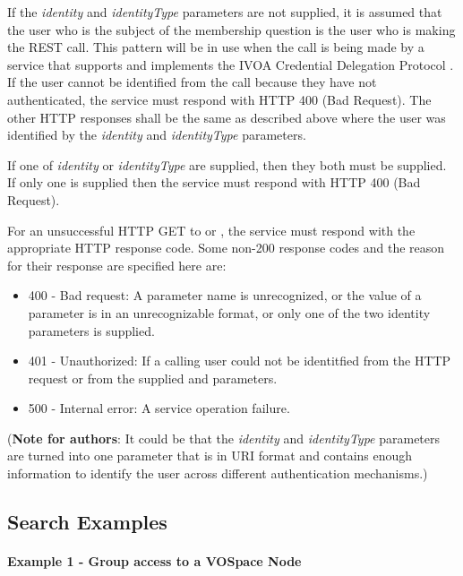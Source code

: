 \documentclass[11pt,a4paper]{ivoa}
\begin{document}
If the \emph{identity} and \emph{identityType} parameters are not supplied, it is assumed that the user who is the subject of the membership question is the user who is making the REST call.  This pattern will be in use when the call is being made by a service that supports and implements the IVOA Credential Delegation Protocol \citep{2010ivoa.spec.0218P}.  If the user cannot be identified from the call because they have not authenticated, the service must respond with HTTP 400 (Bad Request).  The other HTTP responses shall be the same as described above where the user was identified by the \emph{identity} and \emph{identityType} parameters.

If one of \emph{identity} or \emph{identityType} are supplied, then they both must be supplied.  If only one is supplied then the service must respond with HTTP 400 (Bad Request).

For an unsuccessful HTTP GET to  or , the service must respond with the appropriate HTTP response code.  Some non-200 response codes and the reason for their response are specified here are:

\begin{itemize}
\item{400} - Bad request:  A parameter name is unrecognized, or the value of a parameter is in an unrecognizable format, or only one of the two identity parameters is supplied.
\item{401} - Unauthorized:  If a calling user could not be identitfied from the HTTP request or from the supplied  and  parameters.
\item{500} - Internal error:  A service operation failure.
\end{itemize}

(\textbf{Note for authors}: It could be that the \emph{identity} and \emph{identityType} parameters are turned into one parameter that is in URI format and contains enough information to identify the user across different authentication mechanisms.)

\subsection {Search Examples}

\paragraph{Example 1 - Group access to a VOSpace Node}
\end{document}
